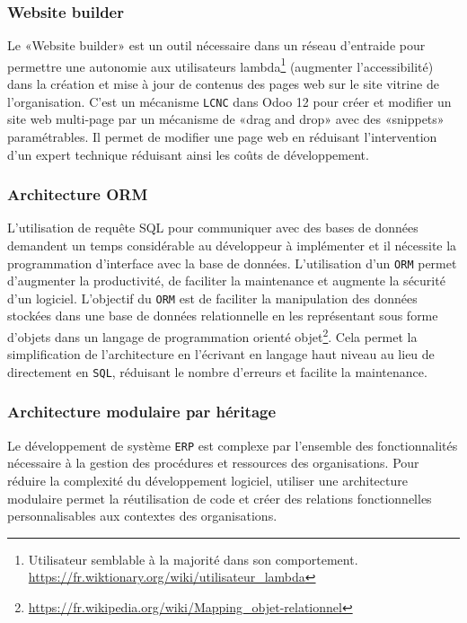 \subsubsection{Website builder}

Le «Website builder» est un outil nécessaire dans un réseau d'entraide pour permettre une autonomie aux utilisateurs lambda\footnote{Utilisateur semblable à la majorité dans son comportement. \url{https://fr.wiktionary.org/wiki/utilisateur_lambda}} (augmenter l'accessibilité) dans la création et mise à jour de contenus des pages web sur le site vitrine de l'organisation. C’est un mécanisme \texttt{LCNC} dans Odoo 12 pour créer et modifier un site web multi-page par un mécanisme de «drag and drop» avec des «snippets» paramétrables. Il permet de modifier une page web en réduisant l’intervention d’un expert technique réduisant ainsi les coûts de développement.

\subsubsection{Architecture ORM}

L'utilisation de requête SQL pour communiquer avec des bases de données demandent un temps considérable au développeur à implémenter et il nécessite la programmation d'interface avec la base de données. L'utilisation d'un \texttt{ORM} permet d'augmenter la productivité, de faciliter la maintenance et augmente la sécurité d'un logiciel. L’objectif du \texttt{ORM} est de faciliter la manipulation des données stockées dans une base de données relationnelle en les représentant sous forme d’objets dans un langage de programmation orienté objet\footnote{\url{https://fr.wikipedia.org/wiki/Mapping_objet-relationnel}}. Cela permet la simplification de l’architecture en l’écrivant en langage haut niveau au lieu de directement en \texttt{SQL}, réduisant le nombre d'erreurs et facilite la maintenance.

\subsubsection{Architecture modulaire par héritage}

Le développement de système \texttt{ERP} est complexe par l'ensemble des fonctionnalités nécessaire à la gestion des procédures et ressources des organisations. Pour réduire la complexité du développement logiciel, utiliser une architecture modulaire permet la réutilisation de code et créer des relations fonctionnelles personnalisables aux contextes des organisations.


